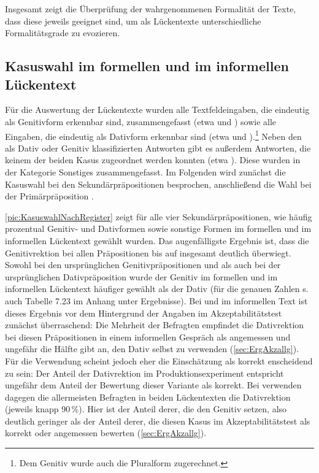 Insgesamt zeigt die Überprüfung der wahrgenommenen Formalität der Texte, dass diese jeweils geeignet sind, um als Lückentexte unterschiedliche Formalitätsgrade zu evozieren. 
 

\subsection{Kasuswahl im formellen und im informellen Lückentext}
\label{sec:ErgProdInfForm}
Für die Auswertung der Lückentexte wurden alle Textfeldeingaben, die eindeutig als Genitivform erkennbar sind, zusammengefasst (etwa  und ) sowie alle Eingaben, die eindeutig als Dativform erkennbar sind (etwa  und ).\footnote{Dem Genitiv wurde auch die Pluralform  zugerechnet.} 
Neben den als Dativ oder Genitiv klassifizierten Antworten gibt es außerdem Antworten, die keinem der beiden Kasus zugeordnet werden konnten (etwa ). 
Diese wurden in der Kategorie \glqq Sonstiges\grqq{} zusammengefasst. 
Im Folgenden wird zunächst die Kasuswahl bei den Sekundärpräpositionen besprochen, anschließend die Wahl bei der Primärpräposition .

\autoref{pic:KasuswahlNachRegister} zeigt für alle vier Sekundärpräpositionen, wie häufig prozentual Genitiv- und Dativformen sowie sonstige Formen im formellen und im informellen Lückentext gewählt wurden. 
Das augenfälligste Ergebnis ist, dass die Genitivrektion bei allen Präpositionen bis auf \gegenueber{} insgesamt deutlich überwiegt.
Sowohl bei den ursprünglichen Genitivpräpositionen \wegen{} und \waehrend{} als auch bei der ursprünglichen Dativpräposition \dank{} wurde der Genitiv im formellen und im informellen Lückentext häufiger gewählt als der Dativ (für die genauen Zahlen s. auch Tabelle 7.23 im Anhang unter Ergebnisse). 
Bei \wegen{} und \waehrend{} im informellen Text ist dieses Ergebnis vor dem Hintergrund der Angaben im Akzeptabilitätstest zunächst überraschend: 
Die Mehrheit der Befragten empfindet die Dativrektion bei diesen Präpositionen in einem informellen Gespräch als angemessen und ungefähr die Hälfte gibt an, den Dativ selbst zu verwenden (\autoref{sec:ErgAkzallg}). 
Für die Verwendung scheint jedoch eher die Einschätzung als korrekt enscheidend zu sein: 
Der Anteil der Dativrektion im Produktionsexperiment entspricht ungefähr dem Anteil der Bewertung dieser Variante als korrekt. 
Bei \gegenueber{} verwenden dagegen die allermeisten Befragten in beiden Lückentexten die Dativrektion (jeweils knapp 90\,\%).
Hier ist der Anteil derer, die den Genitiv setzen, also deutlich geringer als der Anteil derer, die diesen Kasus im Akzeptabilitätstest als korrekt oder angemessen bewerten (\autoref{sec:ErgAkzallg}). 

